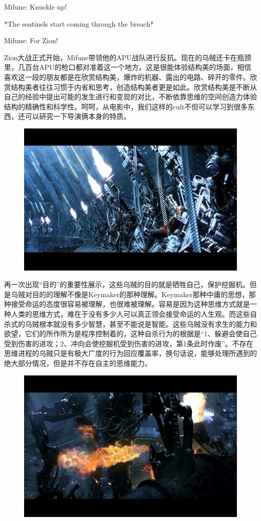 \documentclass[UTF8]{ctexart}
\newenvironment{myquote}{\color{green} \setlength{\leftskip}{6em} \setlength{\rightskip}{4em} \setlength{\parindent}{-2em}}{\par}
\begin{document}
\begin{myquote}
Mifune: Knuckle up!

*The sentinels start coming through the breach*

Mifune: For Zion!
\end{myquote}

Zion大战正式开始，Mifune带领他的APU战队进行反抗。现在的乌贼还卡在瓶颈里，几百台APU的枪口都对准着这一个地方。这是很能体验结构美的场面，相信喜欢这一段的朋友都是在欣赏结构美，爆炸的机器、露出的电路、碎开的零件。欣赏结构美者往往习惯于内省和思考，创造结构美者更是如此。欣赏结构美是不断从自己的经验中提出可能的发生进行和变现的对比，不断依靠思维的空间创造力体验结构的精确性和科学性。呵呵，从电影中，我们这样的cult不但可以学习到很多东西，还可以研究一下导演俩本身的特质。

\begin{figure}[htb]
\centering
\includegraphics[width=0.5\linewidth]{fig/b5c64723f3d126529822edee.jpg}
\end{figure}

再一次出现“目的”的重要性展示，这些乌贼的目的就是牺牲自己，保护挖掘机。但是乌贼对目的的理解不像是Keymaker的那种理解。Keymaker那种中庸的思想，那种接受命运的态度很容易被理解，也很难被理解。容易是因为这种思维方式就是一种人类的思维方式，难在于没有多少人可以真正领会接受命运的人生观。而这些自杀式的乌贼根本就没有多少智慧，甚至不能说是智能。这些乌贼没有求生的能力和欲望，它们的所作所为是程序控制着的，这种自杀行为的根据是“1、躲避会使自己受到伤害的进攻；2、冲向会使挖掘机受到伤害的进攻，第1条此时作废”。不存在思维进程的乌贼只是有极大广度的行为回应覆盖率，换句话说，能够处理所遇到的绝大部分情况，但是并不存在自主的思维能力。

\begin{figure}[htb]
\centering
\includegraphics[width=0.5\linewidth]{fig/ee8e55e709f6992eb93820ee.jpg}
\end{figure}
\end{document}
